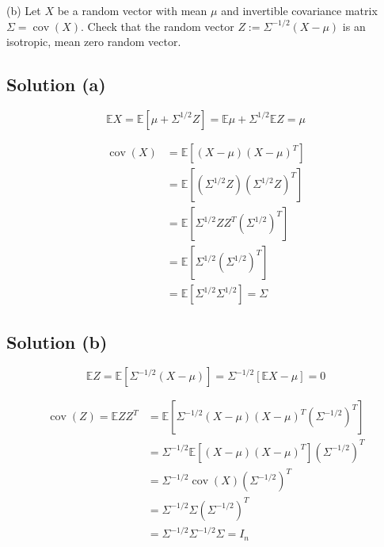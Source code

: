 \documentclass{article}
\DeclareMathOperator{\cov}{cov}
\begin{document}
(b) Let $X$ be a random vector with mean $\mu$ and invertible covariance matrix $\Sigma = \cov(X)$. Check that the random vector $Z:=\Sigma^{-1/2}(X-\mu)$ is an isotropic, mean zero random vector.

\subsection{Solution (a)}

$$\mathbb E X = \mathbb E \left[ \mu + \Sigma^{1/2}Z\right] = \mathbb E\mu + \Sigma^{1/2}\mathbb E Z = \mu$$

\begin{equation*}
    \begin{aligned}
        \cov(X) & = \mathbb E\left[(X-\mu)(X-\mu)^T\right]\\
        & = \mathbb E \left[\left(\Sigma^{1/2}Z\right)\left(\Sigma^{1/2}Z\right)^T\right]\\
        & = \mathbb E \left[\Sigma^{1/2}ZZ^T\left(\Sigma^{1/2}\right)^T\right]\\
        & = \mathbb E \left[\Sigma^{1/2}\left(\Sigma^{1/2}\right)^T\right]\\
        & = \mathbb E \left[\Sigma^{1/2}\Sigma^{1/2}\right] = \Sigma
    \end{aligned}
\end{equation*}

\subsection{Solution (b)}

$$\mathbb E Z = \mathbb E \left[\Sigma^{-1/2}(X-\mu)\right] = \Sigma^{-1/2}\left[\mathbb E X - \mu\right] = 0$$

\begin{equation*}
    \begin{aligned}
        \cov(Z) = \mathbb E ZZ^T & = \mathbb E \left[\Sigma^{-1/2}(X-\mu)(X-\mu)^T\left(\Sigma^{-1/2}\right)^T\right]\\
        & =  \Sigma^{-1/2}\mathbb E\left[(X-\mu)(X-\mu)^T\right]\left(\Sigma^{-1/2}\right)^T\\
        & =  \Sigma^{-1/2}\cov(X)\left(\Sigma^{-1/2}\right)^T\\
        & = \Sigma^{-1/2} \Sigma \left(\Sigma^{-1/2}\right)^T \\
        & = \Sigma^{-1/2}\Sigma^{-1/2}\Sigma= I_n
    \end{aligned}
\end{equation*}
$$$$
\end{document}
